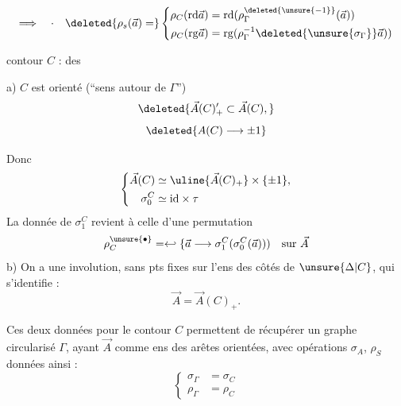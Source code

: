 \[
\Longrightarrow\quad\cdot\quad
\deleted{\rho_s(\vec a)=}
\left\{\begin{aligned}
\rho_C(\mathrm{rd}\vec a)&=\mathrm{rd}(\rho_\Gamma^{\deleted{\unsure{-1}}}(\vec a))\\
\rho_C(\mathrm{rg}\vec a)&=\mathrm{rg}(\rho_\Gamma^{-1}\deleted{\unsure{\sigma_\Gamma}}\vec a))
\end{aligned}\right.
\]

 contour $C$ :   des 

a) $C$ est orienté (``sens  autour de $\Gamma$'')
\[
\deleted{\vec A(C)'_+\subset\vec A(C),}
\]
\[
\deleted{A(C)\longrightarrow\pm1}
\]

Donc
\[
\left\{\begin{aligned}
\vec A(C)&\simeq\uline{\vec A(C)_+}\times\{\pm1\},\\
\sigma_0^C&\simeq\mathrm{id}\times\tau
\end{aligned}\right.
\]
La donnée de $\sigma_1^C$ revient à celle d'une permutation
\[
\rho_C^{\unsure{\bullet}}=\hookleftarrow\{\vec a\longrightarrow\sigma_1^C(\sigma_0^C(\vec a)))\quad\text{sur }\vec A
\]
b) On a une involution, sans pts fixes  sur l'ens  des côtés de $\unsure{\Delta|C}$, qui s'identifie :
\[
\vec A=\vec A(C)_+.
\]

Ces deux données pour le contour $C$ permettent de récupérer un graphe circularisé $\Gamma$, ayant $\vec A$ comme ens des arêtes orientées, avec opérations $\sigma_A$, $\rho_S$ données ainsi :
\[
\left\{\begin{aligned}
\sigma_\Gamma&=\sigma_C\\
\rho_\Gamma&=\rho_C
\end{aligned}\right.
\]

